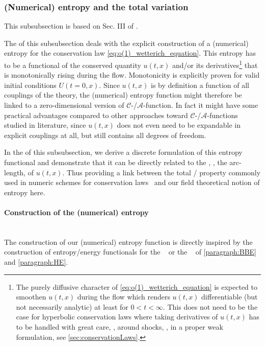 \subsubsection{(Numerical) entropy and the total variation}\label{subsubsec:0dO1entropy_c-function_tvd}
\begin{disclaimer}
	This subsubsection is based on Sec. III of .
\end{disclaimer}
The  of this subsubsection deals with the explicit construction of a (numerical) entropy for the conservation law \eqref{eq:o(1)_wetterich_equation}.
This entropy has to be a functional of the conserved quantity $u ( t, x )$ and/or its derivatives\footnote{%
	The purely diffusive character of \cref{eq:o(1)_wetterich_equation} is expected to smoothen $u ( t, x )$ during the \frg{} flow which renders $u ( t, x )$ differentiable (but not necessarily analytic) at least for $0 < t < \infty$. This does not need to be the case for hyperbolic conservation laws where taking derivatives of $u ( t, x )$ has to be handled with great care, \eg{}, around shocks, \ie{}, in a proper weak formulation, see \cref{sec:conservationLaws}.%
} that is monotonically rising during the \frg{} flow.
Monotonicity is explicitly proven for valid initial conditions $U ( t = 0, x )$.
Since $u ( t, x )$ is by definition a function of all couplings of the theory, the (numerical) entropy function might therefore be linked to a zero-dimensional version of $\mathcal{C}$-/$\mathcal{A}$-function.
In fact it might have some practical advantages compared to other approaches toward $\mathcal{C}$-/$\mathcal{A}$-functions studied in literature, since $u ( t, x )$ does not even need to be expandable in explicit couplings at all, but still contains all degrees of freedom.

In the  of this subsubsection, we derive a discrete formulation of this entropy functional and demonstrate that it can be directly related to the , \ie{}, the arc-length, of $u ( t, x )$.
Thus providing a link between the total \tvd{}/\tvni{} property \dash{} commonly used in numeric schemes for conservation laws~\cite{HARTEN1983357,Lax1973,KTO2-0} \dash{} and our field theoretical notion of entropy here.

\paragraph{Construction of the (numerical) entropy}\label{paragraph:entropy}\mbox{}\\%
The construction of our (numerical) entropy function is directly inspired by the construction of entropy/energy functionals for the \bbeq{}~\cite{Bateman1915,Burgers1948} or the \heq{}~\cite{Cannon:1984} of \cref{paragraph:BBE} and \cref{paragraph:HE}.


